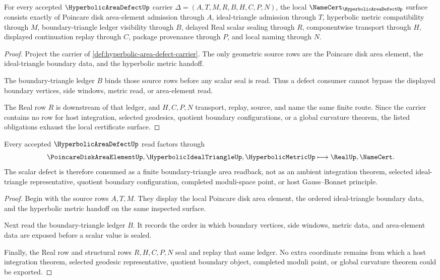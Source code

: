 \begin{theorem}
\label{thm:hyperbolic-area-defect-namecert-obligations}
For every accepted $\HyperbolicAreaDefectUp$ carrier $\Delta=(A,T,M,R,B,H,C,P,N)$, the local $\NameCert_{\HyperbolicAreaDefectUp}$ surface consists exactly of Poincare disk area-element admission through $A$, ideal-triangle admission through $T$, hyperbolic metric compatibility through $M$, boundary-triangle ledger visibility through $B$, delayed Real scalar sealing through $R$, componentwise transport through $H$, displayed continuation replay through $C$, package provenance through $P$, and local naming through $N$.
\end{theorem}
\begin{proof}
Project the carrier of \autoref{def:hyperbolic-area-defect-carrier}. The only geometric source rows are the Poincare disk area element, the ideal-triangle boundary data, and the hyperbolic metric handoff.

The boundary-triangle ledger $B$ binds those source rows before any scalar seal is read. Thus a defect consumer cannot bypass the displayed boundary vertices, side windows, metric read, or area-element read.

The Real row $R$ is downstream of that ledger, and $H,C,P,N$ transport, replay, source, and name the same finite route. Since the carrier contains no row for host integration, selected geodesics, quotient boundary configurations, or a global curvature theorem, the listed obligations exhaust the local certificate surface.
\end{proof}

\begin{theorem}
\label{thm:hyperbolic-area-defect-boundary-triangle-route}
Every accepted $\HyperbolicAreaDefectUp$ read factors through
$$
\PoincareDiskAreaElementUp,\HyperbolicIdealTriangleUp,\HyperbolicMetricUp
\longmapsto
\RealUp,\NameCert .
$$
The scalar defect is therefore consumed as a finite boundary-triangle area readback, not as an ambient integration theorem, selected ideal-triangle representative, quotient boundary configuration, completed moduli-space point, or host Gauss--Bonnet principle.
\end{theorem}
\begin{proof}
Begin with the source rows $A,T,M$. They display the local Poincare disk area element, the ordered ideal-triangle boundary data, and the hyperbolic metric handoff on the same inspected surface.

Next read the boundary-triangle ledger $B$. It records the order in which boundary vertices, side windows, metric data, and area-element data are exposed before a scalar value is sealed.

Finally, the Real row and structural rows $R,H,C,P,N$ seal and replay that same ledger. No extra coordinate remains from which a host integration theorem, selected geodesic representative, quotient boundary object, completed moduli point, or global curvature theorem could be exported.
\end{proof}

